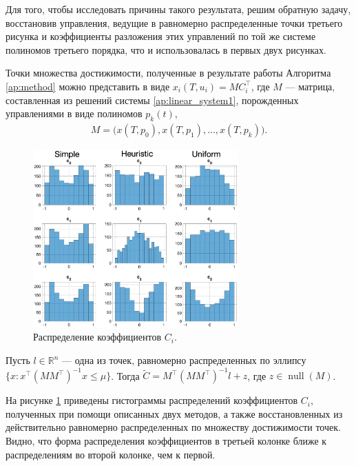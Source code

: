 \documentclass[../main.tex]{subfiles}
\begin{document}
 Для того, чтобы исследовать причины такого результата, решим обратную задачу, восстановив управления, ведущие в равномерно распределенные точки третьего рисунка и коэффициенты разложения этих управлений по той же системе полиномов третьего порядка, что и использовалась в первых двух рисунках.
 
 Точки множества достижимости, полученные в результате работы Алгоритма \ref{ap:method} можно представить в виде $x_i(T, u_i) = M C_i^{\top}$, где $M$ --- матрица, составленная из решений системы \eqref{ap:linear_system1}, порожденных управлениями в виде полиномов $p_k(t)$, 
 \begin{gather}\label{ap:matrix_M}
 	 M = \big(x(T, p_0), x(T, p_1), \dots, x(T, p_k)\big).
 \end{gather} 
 
  \begin{figure}[ht]
 	\centering
 	\includegraphics[width=0.7\textwidth]{images/three_coefficients_distribution.eps}
 	\caption{Распределение коэффициентов $C_i$.}
 	\label{fig:ap:three_coefficients_distribution}
 \end{figure}
 
 Пусть $l\in \mathbb{R}^{n}$ --- одна из точек, равномерно распределенных по эллипсу $\{x: x^{\top} (M M^{\top})^{-1} x \leqslant \mu \}$.
 Тогда $\widetilde{C} = M^{\top} (M M^{\top})^{-1} l + z$, где $z \in \operatorname{null}(M)$.
 
 На рисунке \ref{fig:ap:three_coefficients_distribution} приведены гистограммы распределений коэффициентов $C_i$, полученных при помощи описанных двух методов, а также восстановленных из действительно равномерно распределенных по множеству достижимости точек. 
 Видно, что форма распределения коэффициентов в третьей колонке ближе к распределениям во второй колонке, чем к первой. 
 
\end{document}
